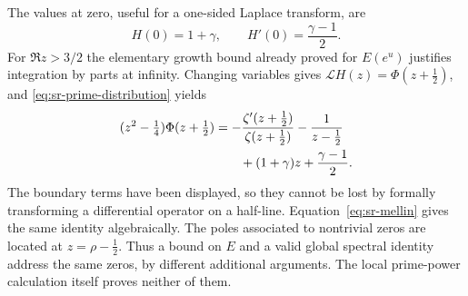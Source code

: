 The values at zero, useful for a one-sided Laplace transform, are
\[
 H(0)=1+\gamma,\qquad H'(0)=\frac{\gamma-1}{2}.
\]
For \(\Re z>3/2\) the elementary growth bound already proved for
\(E(e^u)\) justifies integration by parts at infinity.
Changing variables gives
\(\mathcal L H(z)=\Phi(z+\tfrac12)\), and
\eqref{eq:sr-prime-distribution} yields
\begin{align}
 (z^2-\tfrac14)\Phi(z+\tfrac12)
  &=-\frac{\zeta'(z+\tfrac12)}{\zeta(z+\tfrac12)}
       -\frac1{z-\tfrac12}\notag\\
  &\qquad +(1+\gamma)z+\frac{\gamma-1}{2}.
 \label{eq:sr-centered-transform}
\end{align}
The boundary terms have been displayed, so they cannot be lost by
formally transforming a differential operator on a half-line.
Equation~\eqref{eq:sr-mellin} gives the same identity algebraically.
The poles associated to nontrivial zeros are located at
\(z=\rho-\tfrac12\). Thus a bound on \(E\) and a valid global spectral
identity address the same zeros, by different additional arguments.
The local prime-power calculation itself proves neither of them.

